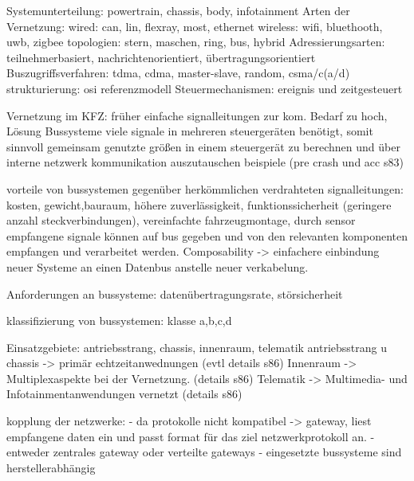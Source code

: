 Systemunterteilung:
powertrain, chassis, body, infotainment
Arten der Vernetzung:
wired: can, lin, flexray, most, ethernet
wireless: wifi, bluethooth, uwb, zigbee
topologien:
stern, maschen, ring, bus, hybrid
Adressierungsarten:
teilnehmerbasiert, nachrichtenorientiert, übertragungsorientiert
Buszugriffsverfahren:
tdma, cdma, master-slave, random, csma/c(a/d)
strukturierung:
osi referenzmodell
Steuermechanismen:
ereignis und zeitgesteuert

Vernetzung im KFZ:
früher einfache signalleitungen zur kom. Bedarf zu hoch, Lösung Bussysteme
viele signale in mehreren steuergeräten benötigt, somit sinnvoll gemeinsam genutzte
größen in einem steuergerät zu berechnen und über interne netzwerk kommunikation auszutauschen
beispiele (pre crash und acc s83)

vorteile von bussystemen gegenüber herkömmlichen verdrahteten signalleitungen:
kosten, gewicht,bauraum, höhere zuverlässigkeit, funktionssicherheit (geringere anzahl steckverbindungen),
vereinfachte fahrzeugmontage, durch sensor empfangene signale können auf bus gegeben und von
den relevanten komponenten empfangen und verarbeitet werden. Composability -> einfachere einbindung neuer
Systeme an einen Datenbus anstelle neuer verkabelung.

Anforderungen an bussysteme:
datenübertragungsrate, störsicherheit

klassifizierung von bussystemen:
klasse a,b,c,d

Einsatzgebiete:
antriebsstrang, chassis, innenraum, telematik
antriebsstrang u chassis -> primär echtzeitanwednungen (evtl details s86)
Innenraum -> Multiplexaspekte bei der Vernetzung. (details s86)
Telematik -> Multimedia- und Infotainmentanwendungen vernetzt (details s86)

kopplung der netzwerke:
- da protokolle nicht kompatibel -> gateway, liest empfangene daten ein
und passt format für das ziel netzwerkprotokoll an.
- entweder zentrales gateway oder verteilte gateways
- eingesetzte bussysteme sind herstellerabhängig


